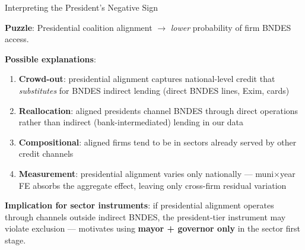\documentclass[aspectratio=169,11pt]{beamer}
\begin{document}
\begin{frame}{Interpreting the President's Negative Sign}

\textbf{Puzzle}: Presidential coalition alignment $\to$ \emph{lower} probability of firm BNDES access.

\medskip

\textbf{Possible explanations}:
\begin{enumerate}
    \item \textbf{Crowd-out}: presidential alignment captures national-level credit that \emph{substitutes} for BNDES indirect lending (direct BNDES lines, Exim, cards)
    \item \textbf{Reallocation}: aligned presidents channel BNDES through direct operations rather than indirect (bank-intermediated) lending in our data
    \item \textbf{Compositional}: aligned firms tend to be in sectors already served by other credit channels
    \item \textbf{Measurement}: presidential alignment varies only nationally --- muni$\times$year FE absorbs the aggregate effect, leaving only cross-firm residual variation
\end{enumerate}

\medskip

\textcolor{notegreen}{\textbf{Implication for sector instruments}}: if presidential alignment operates through channels outside indirect BNDES, the president-tier instrument may violate exclusion --- motivates using \textbf{mayor + governor only} in the sector first stage.

\end{frame}

\end{document}
